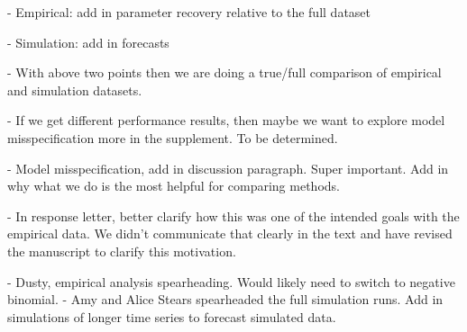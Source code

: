 \documentclass{article}
\begin{document}
- Empirical: add in parameter recovery relative to the full dataset

- Simulation: add in forecasts 

- With above two points then we are doing a true/full comparison of empirical and simulation datasets. 

- If we get different performance results, then maybe we want to explore model misspecification more in the supplement. To be determined.  

- Model misspecification, add in discussion paragraph. Super important. Add in why what we do is the most helpful for comparing methods. 

- In response letter, better clarify how this was one of the intended goals with the empirical data. We didn't communicate that clearly in the text and have revised the manuscript to clarify this motivation. 

- Dusty, empirical analysis spearheading. Would likely need to switch to negative binomial.  
- Amy and Alice Stears spearheaded the full simulation runs. Add in simulations of longer time series to forecast simulated data. 
\end{document}
